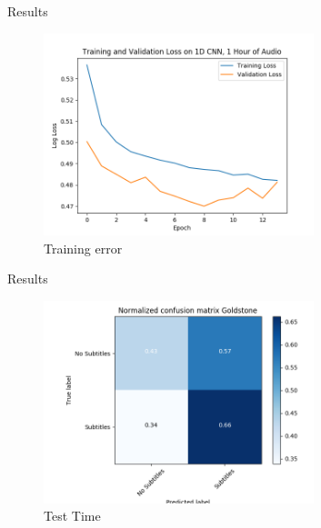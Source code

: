\documentclass[notes]{beamer}
\begin{document}

\begin{frame}{Results}

\begin{figure}
	\includegraphics[width=0.7\textwidth]{figures/train_val_loss_run2}
	\caption{Training error}
\end{figure}

\end{frame}

\begin{frame}{Results}

\begin{figure}
	\includegraphics[width=0.7\textwidth]{figures/CM_Goldstone_fixed}
	\caption{Test Time}
\end{figure}

\end{frame}
\end{document}
